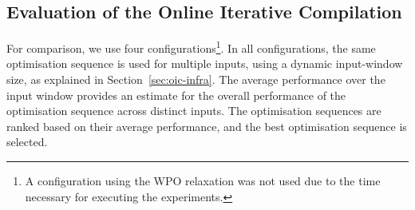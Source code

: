 \documentclass[sigplan,10pt]{acmart}
\theoremstyle{definition}
\newcommand{\IterComp}{{Iterative Compilation}}
\begin{document}
\subsection{Evaluation of the Online {\IterComp}}

For comparison, we use four configurations\footnote{A configuration using the WPO relaxation was not used due to the time necessary for executing the experiments.}.
In all configurations, the same optimisation sequence is used for multiple inputs, using a dynamic input-window size, as explained in Section~\ref{sec:oic-infra}.
The average performance over the input window provides an estimate for the overall performance of the optimisation sequence across distinct inputs.
The optimisation sequences are ranked based on their average performance, and the best optimisation sequence is selected.
\end{document}
